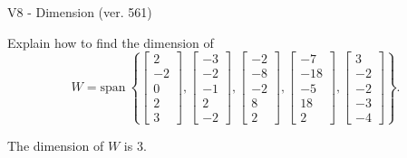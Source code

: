 \begin{exercise}
  \begin{exerciseTitle}V8 - Dimension (ver. 561)\end{exerciseTitle}
  \begin{exerciseStatement}
    Explain how to find the dimension of 
\[W=\mathrm{span}\ \left\{\left[\begin{array}{r}
2 \\
-2 \\
0 \\
2 \\
3
\end{array}\right] , \left[\begin{array}{r}
-3 \\
-2 \\
-1 \\
2 \\
-2
\end{array}\right] , \left[\begin{array}{r}
-2 \\
-8 \\
-2 \\
8 \\
2
\end{array}\right] , \left[\begin{array}{r}
-7 \\
-18 \\
-5 \\
18 \\
2
\end{array}\right] , \left[\begin{array}{r}
3 \\
-2 \\
-2 \\
-3 \\
-4
\end{array}\right]\right\}.\]



  \end{exerciseStatement}
  \begin{exerciseAnswer}
   The dimension of \(W\) is  \(3\).
  


  \end{exerciseAnswer}
\end{exercise}